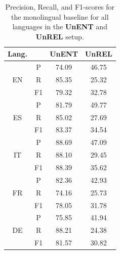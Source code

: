 \begin{table}[ht!]
\fontsize{10}{10}\selectfont
  \centering
    \begin{tabular}{c|c|c|c}
    \toprule
    {Lang.} & & {UnENT} & {UnREL} \\

     \midrule
     
     \multirow{3}{*}{EN} & P  &    74.09            & 46.75 \\
                         & R  &    85.35            & 25.32 \\
                         & F1 &    79.32            & 32.78 \\

     \midrule
     \multirow{3}{*}{ES} & P  &    81.79            & 49.77 \\
                         & R  &    {85.02}          & 27.69 \\
                         & F1 &    83.37            & 34.54 \\

     \midrule
     \multirow{3}{*}{IT} & P  &    {88.69}   & 47.09 \\
                         & R  &    {88.10}   & 29.45 \\
                         & F1 &    {88.39}   & 35.62 \\

     \midrule
     \multirow{3}{*}{FR} & P  &    82.36            & 42.93 \\
                         & R  &    74.16            & 25.73 \\
                         & F1 &    78.05            & 31.78 \\

     \midrule
     \multirow{3}{*}{DE} & P  &    {75.85}   & 41.94 \\
                         & R  &    {88.21}   & 24.38 \\
                         & F1 &    {81.57}   & 30.82 \\

    \bottomrule
    \end{tabular}
      \caption{Precision, Recall, and F1-scores for the monolingual baseline for all languages in the \textbf{UnENT} and \textbf{UnREL} setup.}
  \label{table:baseline}
\end{table}




